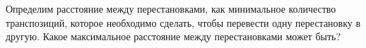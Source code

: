 Определим расстояние между перестановками, как минимальное количество транспозиций, которое необходимо
сделать, чтобы перевести одну перестановку в другую. Какое максимальное расстояние между перестановками
может быть?
